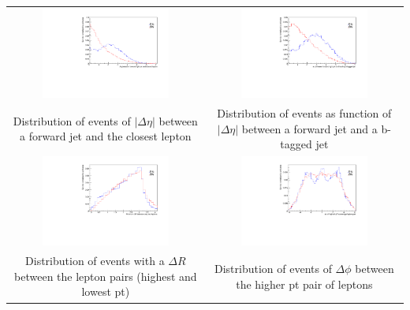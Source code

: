 \documentclass[11pt]{beamer}
\newcommand\Fontvi{\fontsize{4}{7.2}\selectfont}
\newcommand{\nologo}{\setbeamertemplate{logo}{}}
\begin{document}
{\nologo
	\begin{frame}
		\Fontvi
		\begin{center}
			\begin{tabular}{cc}
				\includegraphics[width=5.5cm,height=3cm]{figures/distributions/compare_variables-eta-fj-cl} &
				\includegraphics[width=5.5cm,height=3cm]{figures/distributions/compare_variables-eta-fj-b1}\\ 
				{Distribution of events of $|\Delta\eta|$ between a forward jet and the closest lepton} & {	Distribution of events as function of $|\Delta\eta|$ between a forward jet and a b-tagged jet } \\
				\includegraphics[width=5.5cm,height=3cm]{figures/distributions/compare_variables-dr}&
				\includegraphics[width=5.5cm,height=3cm]{figures/distributions/compare_variables-phi}\\
				{Distribution of events with a $\Delta R$ between the lepton pairs (highest and lowest pt)} & {Distribution of events of $\Delta\phi$ between the higher pt pair of leptons } \\
			\end{tabular}
		\end{center}
	\end{frame}
}
\end{document}
